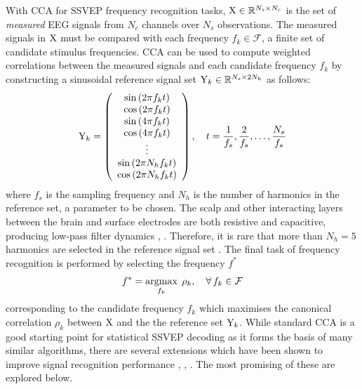 With CCA for SSVEP frequency recognition tasks, ${\textrm{X}} \in \mathbb{R}^{N_s\times N_c}$ is the set of \textit{measured} EEG signals from $N_c$ channels over $N_s$ observations. The measured signals in ${\textrm{X}}$ must be compared with each frequency $f_k \in \mathcal{F}$, a finite set of candidate stimulus frequencies. CCA can be used to compute weighted correlations between the measured signals and each candidate frequency $f_k$ by constructing a sinusoidal reference signal set ${\textrm{Y}}_k \in \mathbb{R}^{N_s \times 2N_h}$ as follows: 
\begin{equation}
{\textrm{Y}}_{k}=\left(\begin{array}{c}
\sin \left(2 \pi f_{k} t\right) \\
\cos \left(2 \pi f_{k} t\right) \\
\sin \left(4 \pi f_{k} t\right) \\
\cos \left(4 \pi f_{k} t\right) \\
\vdots \\
\sin \left(2 \pi N_h f_{k} t\right) \\
\cos \left(2 \pi N_h f_{k} t\right)
\end{array}\right), \quad t=\frac{1}{f_s}, \frac{2}{f_s}, \ldots, \frac{N_s}{f_s}
\end{equation}
where $f_s$ is the sampling frequency and $N_h$ is the number of harmonics in the reference set, a parameter to be chosen. The scalp and other interacting layers between the brain and surface electrodes are both resistive and capacitive, producing low-pass filter dynamics \cite{baillet-em-brain-mapping}, \cite{lin-cca-2006}. Therefore, it is rare that more than $N_h=5$ harmonics are selected in the reference signal set \cite{lin-cca-2006}. The final task of frequency recognition is performed by selecting the frequency $f^*$
\begin{equation}
    f^* = \operatorname*{argmax}_{f_k} \; \rho_k, \quad \forall \, f_k \in \mathcal{F}
    \label{eq:cca-freq-discrimination}
\end{equation}
corresponding to the candidate frequency $f_k$ which maximises the canonical correlation $\rho_k$ between ${\textrm{X}}$ and the the reference set ${\textrm{Y}}_k$. While standard CCA is a good starting point for statistical SSVEP decoding as it forms the basis of many similar algorithms, there are several extensions which have been shown to improve signal recognition performance \cite{zhang-mset-cca}, \cite{sun-gcca}, \cite{miao-hybrid-cca}. The most promising of these are explored below.

